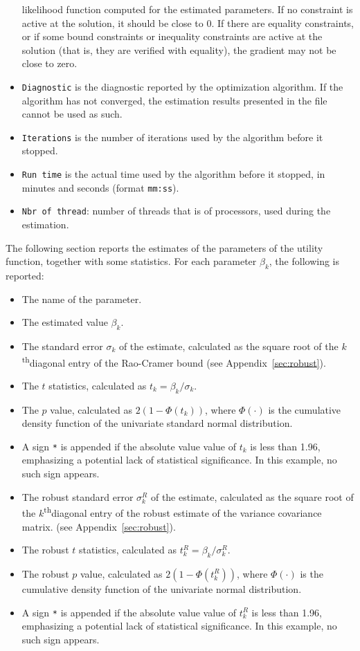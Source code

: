 \documentclass[12pt,a4paper]{article}
\renewcommand{\th}{\textsuperscript{th}}
\begin{document}
\begin{itemize}
        likelihood function computed for the estimated parameters. If
        no constraint is active at the solution, it should be close to
        0. If there are equality constraints, or if some bound
        constraints or inequality constraints are active at the
        solution (that is, they are verified with equality), the
        gradient may not be close to zero.
\item \lstinline+Diagnostic+ is the diagnostic reported by the optimization
algorithm. If the algorithm has not converged, the estimation results presented
in the file cannot be used as such. 
\item \lstinline+Iterations+ is the number of iterations used by the
algorithm before it stopped. 
\item \lstinline+Run time+ is the actual time used by the algorithm before
it stopped, in minutes and seconds (format \texttt{mm:ss}).
\item \lstinline+Nbr of thread+: number of threads that is of
  processors, used during the estimation. 
   \end{itemize}


The following section reports the estimates of the parameters of the
utility function,
together with some statistics. For each parameter $\beta_k$, the following is reported:
   \begin{itemize}
  \item The name of the parameter.
      \item The estimated value $\beta_k$. 
      \item The standard error $\sigma_k$ of the estimate, calculated as the
         square root of the $k$\th diagonal entry of the
         Rao-Cramer bound (see Appendix~\ref{sec:robust}).
     \item The $t$ statistics, calculated as $t_k=\beta_k/\sigma_k$.
     \item The $p$ value, calculated as $2 (1 - \Phi(t_k))$,
where $\Phi(\cdot)$ is the cumulative density function of the
univariate standard normal distribution. 
     \item  A sign \lstinline$*$ is
         appended if the absolute value value of $t_k$ is less than
         1.96, emphasizing a potential lack of statistical
         significance. In this example, no such sign appears. 
      \item The robust standard error $\sigma^R_k$ of the estimate, calculated as the
         square root of the $k$\th diagonal entry of the
         robust estimate of the variance covariance matrix. (see Appendix~\ref{sec:robust}).
     \item The robust $t$ statistics, calculated as $t^R_k=\beta_k/\sigma^R_k$.
     \item The robust $p$ value, calculated as $2 (1 - \Phi(t^R_k))$,
where $\Phi(\cdot)$ is the cumulative density function of the
univariate normal distribution. 
     \item  A sign \lstinline$*$ is
         appended if the absolute value value of $t^R_k$ is less than
         1.96, emphasizing a potential lack of statistical
         significance. In this example, no such sign appears. 
   \end{itemize}
\end{document}

